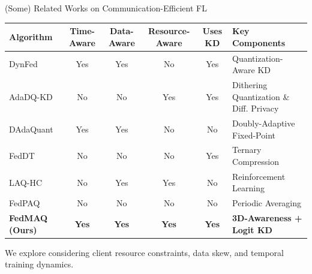 \documentclass[11pt, aspectratio=169]{beamer}
\begin{document}
\begin{frame}{(Some) Related Works on Communication-Efficient FL}
    \centering
    \vfill
    \begin{table}
        \fontsize{7pt}{9.5pt}\selectfont
        \begin{tabular}{lcccc p{3.6cm}}
            \toprule
            \textbf{Algorithm}     & \textbf{Time-Aware} & \textbf{Data-Aware} & \textbf{Resource-Aware} & \textbf{Uses KD} & \textbf{Key Components}                 \\
            \midrule
            DynFed                 & Yes                 & Yes                 & No                      & Yes              & Quantization-Aware KD                   \\
            AdaDQ-KD               & No                  & No                  & Yes                     & Yes              & Dithering Quantization \& Diff. Privacy \\
            DAdaQuant              & Yes                 & Yes                 & No                      & No               & Doubly-Adaptive Fixed-Point             \\
            FedDT                  & No                  & No                  & No                      & Yes              & Ternary Compression                     \\
            LAQ-HC                 & No                  & Yes                 & Yes                     & No               & Reinforcement Learning                  \\
            FedPAQ                 & No                  & No                  & No                      & No               & Periodic Averaging                      \\
            \midrule
            \textbf{FedMAQ (Ours)} & \textbf{Yes}        & \textbf{Yes}        & \textbf{Yes}            & \textbf{Yes}     & \textbf{3D-Awareness + Logit KD}        \\
            \bottomrule
        \end{tabular}
    \end{table}
    \vspace{0.15cm}

    {\fontsize{8pt}{9.5pt}\selectfont We explore considering client resource constraints, data skew, and temporal training dynamics.}
    \vfill
\end{frame}
\end{document}
